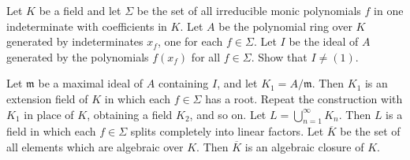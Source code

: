 \documentclass{solution}
\begin{document}
\begin{problem}
    Let $K$ be a field and let $\Sigma$ be the set of all irreducible monic polynomials $f$ in one indeterminate with coefficients in $K$. Let $A$ be the polynomial ring over $K$ generated by indeterminates $x_f$, one for each $f \in \Sigma$. Let $I$ be the ideal of $A$ generated by the polynomials $f(x_f)$ for all $f \in \Sigma$. Show that $I \ne (1)$.

    Let $\mathfrak{m}$ be a maximal ideal of $A$ containing $I$, and let $K_1 = A / \mathfrak{m}$. Then $K_1$ is an extension field of $K$ in which each $f \in \Sigma$ has a root. Repeat the construction with $K_1$ in place of $K$, obtaining a field $K_2$, and so on. Let $L = \bigcup\limits_{n = 1}^{\infty} K_n$. Then $L$ is a field in which each $f \in \Sigma$ splits completely into linear factors. Let $\overline{K}$ be the set of all elements which are algebraic over $K$. Then $\overline{K}$ is an algebraic closure of $K$.
\end{problem}
\end{document}
